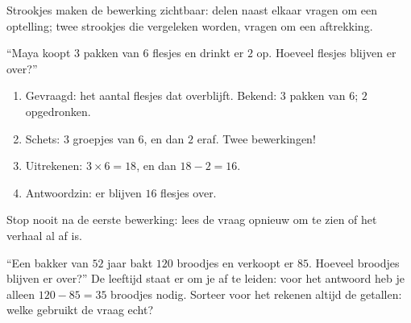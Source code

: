 \begin{omfigure}

{\small Strookjes maken de bewerking zichtbaar: delen naast elkaar vragen
om een optelling; twee strookjes die vergeleken worden, vragen om een
aftrekking.}
\end{omfigure}

\begin{example}\label{ex:g3:problems:twostep}
``Maya koopt $3$ pakken van $6$ flesjes en drinkt er $2$ op. Hoeveel
flesjes blijven er over?''
\begin{enumerate}
  \item Gevraagd: het aantal flesjes dat overblijft. Bekend: $3$ pakken
        van $6$; $2$ opgedronken.
  \item Schets: $3$ groepjes van $6$, en dan $2$ eraf. Twee bewerkingen!
  \item Uitrekenen: $3 \times 6 = 18$, en dan $18 - 2 = 16$.
  \item Antwoordzin: er blijven $16$ flesjes over.
\end{enumerate}
Stop nooit na de eerste bewerking: lees de vraag opnieuw om te zien of het
verhaal al af is.
\end{example}

\begin{example}\label{ex:g3:problems:trap}
``Een bakker van $52$ jaar bakt $120$ broodjes en verkoopt er $85$.
Hoeveel broodjes blijven er over?'' De leeftijd staat er om je af te
leiden: voor het antwoord heb je alleen $120 - 85 = 35$ broodjes nodig.
Sorteer voor het rekenen altijd de getallen: welke gebruikt de vraag echt?
\end{example}

